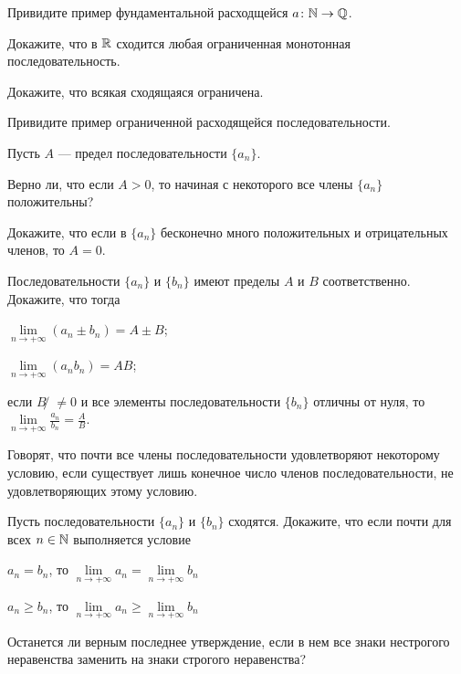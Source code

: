 \documentclass[a4paper, 12pt, num=30]{listok}
\begin{document}
\begin{problem}
    Привидите пример фундаментальной расходщейся $a \colon \mathbb{N} \to \mathbb{Q}$.
\end{problem}
\begin{problem}
    Докажите, что в $\mathbb{R}$ сходится любая ограниченная монотонная последовательность.
\end{problem}
\begin{problem}
    \begin{probparts}
        \item Докажите, что всякая сходящаяся ограничена.
        \item Привидите пример ограниченной расходящейся последовательности.
    \end{probparts}
\end{problem}
\begin{problem}
    Пусть $A$ --- предел последовательности $\{a_n\}$.
    \begin{probparts}
        \item Верно ли, что если $A > 0$, то начиная с некоторого все члены $\{a_n\}$ положительны?
        \item Докажите, что если в $\{a_n\}$ бесконечно много положительных и отрицательных членов, то $A = 0$.
    \end{probparts}
\end{problem}
\begin{problem}
    Последовательности $\{a_n\}$ и $\{b_n\}$ имеют пределы $A$ и $B$ соответственно.
    Докажите, что тогда
    \begin{probenum}
        \item $\lim\limits_{n \to +\infty} (a_n \pm b_n) = A \pm B$;
        \item $\lim\limits_{n \to +\infty} (a_n  b_n) = A B$;
        \item если $B ̸\ne 0$ и все элементы последовательности $\{b_n\}$ отличны от нуля, то
            $\lim\limits_{n \to +\infty} \frac{a_n}{b_n} = \frac AB$.
    \end{probenum}
\end{problem}
\begin{definition}
    Говорят, что почти все члены последовательности удовлетворяют некоторому условию,
    если существует лишь конечное число членов последовательности, не удовлетворяющих этому условию.
\end{definition}
\begin{problem}
    Пусть последовательности $\{a_n\}$ и $\{b_n\}$ сходятся.
    Докажите, что если почти для всех $n \in \mathbb{N}$ выполняется условие
    \begin{probparts}
        \item $a_n = b_n$, то $\lim\limits_{n \to +\infty} a_n = \lim\limits_{n \to +\infty} b_n$
        \item $a_n \ge b_n$, то $\lim\limits_{n \to +\infty} a_n \ge \lim\limits_{n \to +\infty} b_n$
        \item Останется ли верным последнее утверждение, если в нем все знаки нестрогого неравенства заменить на знаки строгого неравенства?
    \end{probparts}
\end{problem}
\end{document}
